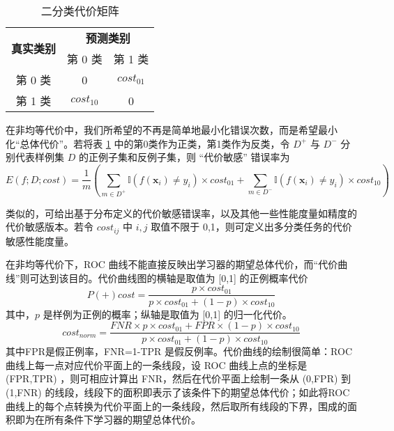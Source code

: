 \begin{table}[H]
    \centering
    \caption{二分类代价矩阵}
    \label{table:二分类代价矩阵}
    \setlength{\tabcolsep}{7mm}
    \begin{tabular}{c|c|c}
        \toprule
        \multirow{2}{*}{\textbf{真实类别}} & \multicolumn{2}{c}{\textbf{预测类别}} \\
        \cline{2-3}
        & 第 0 类 & 第 1 类 \\
        \midrule
        第 0 类 & 0 & $cost_{01}$ \\
        第 1 类 & $cost_{10}$ & 0 \\
        \bottomrule
    \end{tabular}
\end{table}

在非均等代价中，我们所希望的不再是简单地最小化错误次数，而是希望最小化``总体代价''。若将表 \ref{table:二分类代价矩阵} 中的第0类作为正类，第1类作为反类，令 $D^+$ 与 $D^-$ 分别代表样例集 $D$ 的正例子集和反例子集，则 ``代价敏感'' 错误率为 
\begin{equation}
    E(f;D;cost) = \frac{1}{m}\left( \sum_{m\in D^+} \mathbb{I} (f(\mathbf{x}_i) \neq y_i ) \times cost_{01} + \sum_{m\in D^-} \mathbb{I} (f(\mathbf{x}_i) \neq y_i ) \times cost_{10}   \right)
\end{equation}

类似的，可给出基于分布定义的代价敏感错误率，以及其他一些性能度量如精度的代价敏感版本。若令 $cost_{ij}$ 中 $i,j$ 取值不限于 0,1，则可定义出多分类任务的代价敏感性能度量。

在非均等代价下，ROC 曲线不能直接反映出学习器的期望总体代价，而``代价曲线''则可达到该目的。代价曲线图的横轴是取值为 [0,1] 的正例概率代价
\begin{equation}
    P(+)cost = \frac{p\times cost_{01}}{p \times cost_{01} + (1-p) \times cost_{10}}
\end{equation}
其中，$p$ 是样例为正例的概率；纵轴是取值为 [0,1] 的归一化代价。
\begin{equation}
    cost_{norm} = \frac{FNR \times p \times cost_{01} + FPR \times (1-p)\times cost_{10}}{p\times cost_{01} + (1-p)\times cost_{10}}
\end{equation}
其中FPR是假正例率，FNR=1-TPR 是假反例率。代价曲线的绘制很简单：ROC 曲线上每一点对应代价平面上的一条线段，设 ROC 曲线上点的坐标是 (FPR,TPR) ，则可相应计算出 FNR，然后在代价平面上绘制一条从 (0,FPR) 到 (1,FNR) 的线段，线段下的面积即表示了该条件下的期望总体代价；如此将ROC曲线上的每个点转换为代价平面上的一条线段，然后取所有线段的下界，围成的面积即为在所有条件下学习器的期望总体代价。

